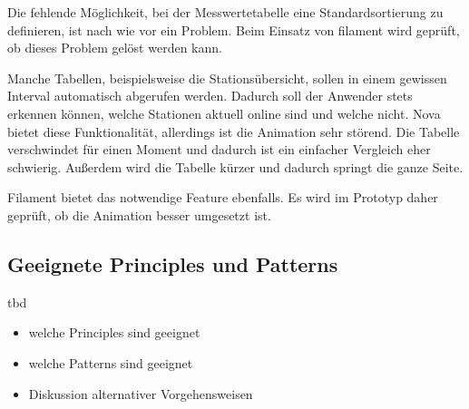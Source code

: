 \newpage

Die fehlende Möglichkeit, bei der Messwertetabelle eine Standardsortierung zu definieren, ist nach wie vor ein Problem.
Beim Einsatz von filament wird geprüft, ob dieses Problem gelöst werden kann.

Manche Tabellen, beispielsweise die Stationsübersicht, sollen in einem gewissen Interval automatisch abgerufen werden.
Dadurch soll der Anwender stets erkennen können, welche Stationen aktuell online sind und welche nicht.
Nova bietet diese Funktionalität, allerdings ist die Animation sehr störend.
Die Tabelle verschwindet für einen Moment und dadurch ist ein einfacher Vergleich eher schwierig.
Außerdem wird die Tabelle kürzer und dadurch springt die ganze Seite.

Filament bietet das notwendige Feature ebenfalls.
Es wird im Prototyp daher geprüft, ob die Animation besser umgesetzt ist.

\subsection{Geeignete Principles und Patterns}
tbd
\begin{itemize}
    \item welche Principles sind geeignet
    \item welche Patterns sind geeignet
    \item Diskussion alternativer Vorgehensweisen
\end{itemize}

